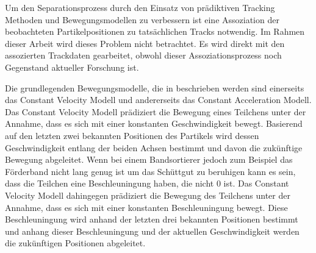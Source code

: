 Um den Separationsprozess durch den Einsatz von prädiktiven Tracking Methoden und Bewegungsmodellen zu verbessern ist eine Assoziation 
der beobachteten Partikelpositionen zu tatsächlichen Tracks notwendig. 
Im Rahmen dieser Arbeit wird dieses Problem nicht betrachtet. 
Es wird direkt mit den assozierten Trackdaten gearbeitet, 
obwohl dieser Assoziationsprozess noch Gegenstand aktueller Forschung ist.

Die grundlegenden Bewegungsmodelle, die in \cite{Pfaff2018} beschrieben werden sind 
einerseits das Constant Velocity Modell und andererseits das Constant Acceleration Modell.
Das Constant Velocity Modell prädiziert die Bewegung eines Teilchens unter der Annahme, dass es sich mit einer konstanten Geschwindigkeit bewegt.
Basierend auf den letzten zwei bekannten Positionen des Partikels wird dessen Geschwindigkeit entlang der beiden Achsen bestimmt 
und davon die zukünftige Bewegung abgeleitet.
Wenn bei einem Bandsortierer jedoch zum Beispiel das Förderband nicht lang genug ist um das Schüttgut zu beruhigen kann es sein, 
dass die Teilchen eine Beschleuningung haben, die nicht 0 ist.
Das Constant Velocity Modell dahingegen prädiziert die Bewegung des Teilchens unter der Annahme, dass es sich mit einer konstanten Beschleuningung bewegt.
Diese Beschleuningung wird anhand der letzten drei bekannten Positionen bestimmt 
und anhang dieser Beschleuningung und der aktuellen Geschwindigkeit werden die zukünftigen Positionen abgeleitet.

